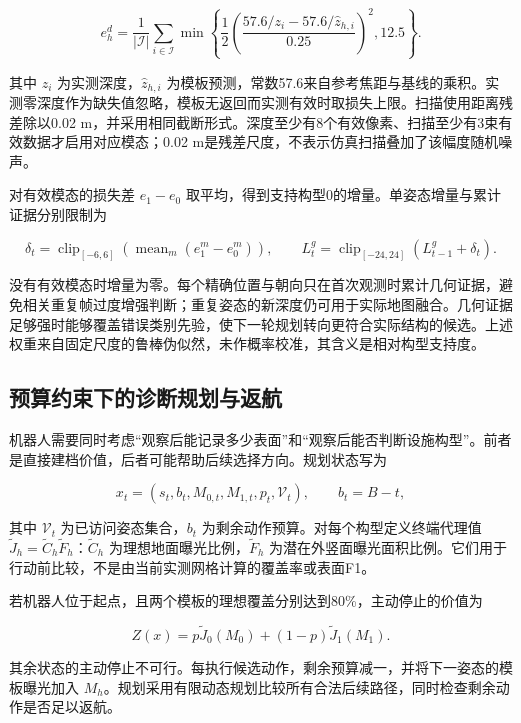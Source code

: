 \documentclass[11pt,a4paper]{article}
\begin{document}
\[
e_h^d=\frac{1}{|\mathcal I|}\sum_{i\in\mathcal I}
\min\left\{\frac12
\left(\frac{57.6/z_i-57.6/\widehat z_{h,i}}{0.25}\right)^2,
12.5\right\}.
\]

其中 \(z_i\) 为实测深度，\(\widehat z_{h,i}\) 为模板预测，常数57.6来自参考焦距与基线的乘积。实测零深度作为缺失值忽略，模板无返回而实测有效时取损失上限。扫描使用距离残差除以0.02 m，并采用相同截断形式。深度至少有8个有效像素、扫描至少有3束有效数据才启用对应模态；0.02 m是残差尺度，不表示仿真扫描叠加了该幅度随机噪声。

对有效模态的损失差 \(e_1-e_0\) 取平均，得到支持构型0的增量。单姿态增量与累计证据分别限制为

\[
\delta_t=\operatorname{clip}_{[-6,6]}
\left(\operatorname{mean}_{m}(e_1^m-e_0^m)\right),
\qquad
L_t^g=\operatorname{clip}_{[-24,24]}(L_{t-1}^g+\delta_t).
\]

没有有效模态时增量为零。每个精确位置与朝向只在首次观测时累计几何证据，避免相关重复帧过度增强判断；重复姿态的新深度仍可用于实际地图融合。几何证据足够强时能够覆盖错误类别先验，使下一轮规划转向更符合实际结构的候选。上述权重来自固定尺度的鲁棒伪似然，未作概率校准，其含义是相对构型支持度。

\hypertarget{ux9884ux7b97ux7ea6ux675fux4e0bux7684ux8bcaux65adux89c4ux5212ux4e0eux8fd4ux822a}{%
\subsection{预算约束下的诊断规划与返航}\label{ux9884ux7b97ux7ea6ux675fux4e0bux7684ux8bcaux65adux89c4ux5212ux4e0eux8fd4ux822a}}

机器人需要同时考虑``观察后能记录多少表面''和``观察后能否判断设施构型''。前者是直接建档价值，后者可能帮助后续选择方向。规划状态写为

\[
x_t=(s_t,b_t,M_{0,t},M_{1,t},p_t,\mathcal V_t),
\qquad b_t=B-t,
\]

其中 \(\mathcal V_t\) 为已访问姿态集合，\(b_t\) 为剩余动作预算。对每个构型定义终端代理值 \(\widetilde J_h=\widetilde C_h\widetilde F_h\)：\(\widetilde C_h\) 为理想地面曝光比例，\(\widetilde F_h\) 为潜在外竖面曝光面积比例。它们用于行动前比较，不是由当前实测网格计算的覆盖率或表面F1。

若机器人位于起点，且两个模板的理想覆盖分别达到80\%，主动停止的价值为

\[
Z(x)=p\widetilde J_0(M_0)+(1-p)\widetilde J_1(M_1).
\]

其余状态的主动停止不可行。每执行候选动作，剩余预算减一，并将下一姿态的模板曝光加入 \(M_h\)。规划采用有限动态规划比较所有合法后续路径，同时检查剩余动作是否足以返航。
\end{document}
